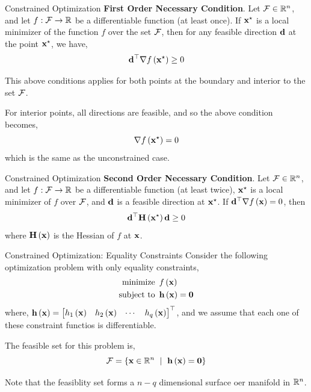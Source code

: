 \documentclass[aspectratio=169]{beamer}
\def\mf{\ensuremath\mathbf}
\def\mb{\ensuremath\mathbb}
\def\mc{\ensuremath\mathcal}
\def\lp{\ensuremath\left(}
\def\rp{\ensuremath\right)}
\def\lc{\ensuremath\left\{}
\def\rc{\ensuremath\right\}}
\def\bmx{\ensuremath\begin{bmatrix*}[r]}
\def\emx{\ensuremath\end{bmatrix*}}
\def\R{\ensuremath\mb{R}}
\newcommand{\ct}[1]{\lp #1\rp}
\begin{document}
\begin{frame}[t]{Constrained Optimization}
  \textbf{First Order Necessary Condition}. Let $\mc{F} \in \R^n$, and let $f: \mc{F} \to \R$ be a differentiable function (at least once). If $\mf{x}^{\star}$ is a local minimizer of the function $f$ over the set $\mc{F}$, then for any feasible direction $\mf{d}$ at the point $\mf{x}^{\star}$, we have,
  \[ \mf{d}^\top \nabla f\ct{\mf{x}^\star} \geq 0 \]

  This above conditions applies for both points at the boundary and interior to the set $\mc{F}$.
  \vspace{0.2cm}

  For interior points, all directions are feasible, and so the above condition becomes,
  \[ \nabla f\ct{\mf{x}^\star} = 0 \]
  which is the same as the unconstrained case.
\end{frame}


\begin{frame}[t]{Constrained Optimization}
  \textbf{Second Order Necessary Condition}. Let $\mc{F} \in \R^n$, and let $f: \mc{F} \to \R$ be a differentiable function (at least twice), $\mf{x}^{\star}$ is a local minimizer of $f$ over $\mc{F}$, and $\mf{d}$ is a feasible direction at $\mf{x}^{\star}$. If $\mf{d}^\top\nabla f\ct{\mf{x}} = 0$, then 
  \[ \mf{d}^\top \mf{H}\ct{\mf{x}^\star}\mf{d} \geq 0 \]
  where $\mf{H}\ct{\mf{x}}$ is the Hessian of $f$ at $\mf{x}$.
  \vspace{0.2cm}
\end{frame}


\begin{frame}[t]{Constrained Optimization: Equality Constraints}
  Consider the following optimization problem with only equality constraints,
  \[ \begin{split}
    \text{minimize}
    & \,\,\, f\ct{\mf{x}} \\
    \mathrm{subject \,\, to} & \,\,\, \mf{h}\ct{\mf{x}} = \mf{0} \\
  \end{split} \]
  where, $\mf{h}\ct{\mf{x}} = \bmx h_1\ct{\mf{x}} & h_2\ct{\mf{x}} & \cdots & h_q\ct{\mf{x}}\emx^\top$, and we assume that each one of these constraint functios is differentiable.
  \vspace{0.2cm}

  The feasible set for this problem is,
  \[ \mc{F} = \lc \mf{x} \in \mb{R}^n \,\,\mid \,\, \mf{h}\ct{\mf{x}} = \mf{0} \rc \]

  Note that the feasiblity set forms a $n - q$ dimensional surface oer manifold in $\R^n$.
\end{frame}
\end{document}
